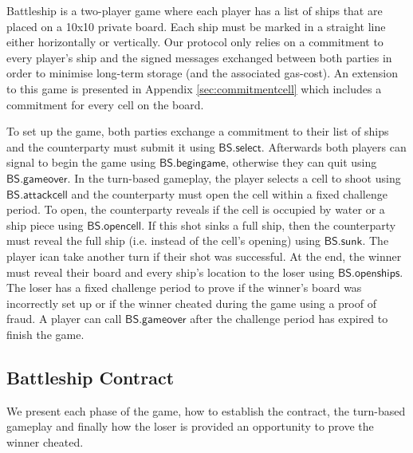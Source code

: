 \documentclass{llncs}
\newcommand{\battleshipattackcell}{\mathsf{BS.attackcell}}
\newcommand{\battleshipbegin}{\mathsf{BS.begingame}}
\newcommand{\battleshipselectboard}{\mathsf{BS.select}}
\newcommand{\battleshiprevealcell}{\mathsf{BS.opencell}}
\newcommand{\battleshipsinking}{\mathsf{BS.sunk}}
\newcommand{\battleshiprevealboard}{\mathsf{BS.openships}}
\newcommand{\battleshipgameover}{\mathsf{BS.gameover}}
\begin{document}
	Battleship is a two-player game where each player has a list of ships that are placed on a 10x10 private board. 
	Each ship must be marked in a straight line either horizontally or vertically.
	Our protocol only relies on a commitment to every player's ship and the signed messages exchanged between both parties in order to minimise long-term storage (and the associated gas-cost).
	An extension to this game is presented in Appendix \ref{sec:commitmentcell} which includes a commitment for every cell on the board. 
	
	
	To set up the game, both parties exchange a commitment to their list of ships and the counterparty must submit it using $\battleshipselectboard$. 
	Afterwards both players can signal to begin the game using $\battleshipbegin$, otherwise they can quit using $\battleshipgameover$. 
	In the turn-based gameplay, the player selects a cell to shoot using $\battleshipattackcell$ and the counterparty must open the cell  within a fixed challenge period. 
	To open, the counterparty reveals if the cell is occupied by water or a ship piece using $\battleshiprevealcell$.
	If this shot sinks a full ship, then the counterparty must reveal the full ship (i.e. instead of the cell's opening) using $\battleshipsinking$. 
	The player ican take another turn if their shot was successful.
	At the end, the winner must reveal their board and every ship's location to the loser using $\battleshiprevealboard$.
	The loser has a fixed challenge period to prove if the winner's board was incorrectly set up or if the winner cheated during the game using a proof of fraud. 
	A player can call $\battleshipgameover$ after the challenge period has expired to finish the game. 
	
	\subsection{Battleship Contract}\label{sec:battleshipcontract}
	
	We present each phase of the game, how to establish the contract, the turn-based gameplay and finally how the loser is provided an opportunity to prove the winner cheated.
	
\end{document}
